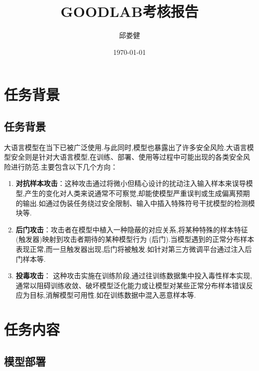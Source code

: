 \documentclass[12pt]{ctexart}
\title{GOODLAB考核报告}
\author{邱娄健}
\date{\today}
\begin{document}
\maketitle

\setcounter{page}{1}
\tableofcontents
\setcounter{page}{1}

\section{任务背景}

\subsection{任务背景}

大语言模型在当下已被广泛使用.与此同时,模型也暴露出了许多安全风险.大语言模型安全则是针对大语言模型,在训练、部署、使用等过程中可能出现的各类安全风险进行防范.主要包含以下几个方向：

\begin{enumerate}

    \item \textbf{对抗样本攻击}：这种攻击通过将微小但精心设计的扰动注入输入样本来误导模型,产生的变化对人类来说通常不可察觉,却能使模型严重误判或生成偏离预期的输出.如通过伪装任务绕过安全限制、输入中插入特殊符号干扰模型的检测模块等.

    \item \textbf{后门攻击}：攻击者在模型中植入一种隐蔽的对应关系,将某种特殊的样本特征 (触发器)映射到攻击者期待的某种模型行为 (后门).当模型遇到的正常分布样本表现正常,而一旦触发器出现,后门将被触发.如针对第三方微调平台通过注入后门样本等.

    \item \textbf{投毒攻击}： 这种攻击实施在训练阶段,通过往训练数据集中投入毒性样本实现,通常以阻碍训练收敛、破坏模型泛化能力或让模型对某些正常分布样本错误反应为目标,消解模型可用性.如在训练数据中混入恶意样本等.

\end{enumerate}

\section{任务内容}

\subsection{模型部署}
\end{document}
